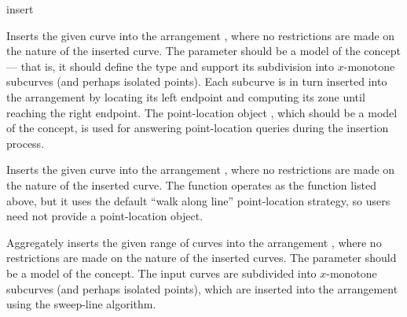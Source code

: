 
\begin{ccRefFunction}{insert}


   {Inserts the given curve  into the arrangement , where
    no restrictions are made on the nature of the inserted curve.
    The  parameter should be a model of the
    concept --- that is, it should define the  type and support
    its subdivision into $x$-monotone subcurves (and perhaps isolated points).
    Each subcurve is in turn inserted into the arrangement by locating its
    left endpoint and computing its zone until reaching the right endpoint.
    The point-location object , which should be a model of the
     concept, is used for answering
    point-location queries during the insertion process.
    }

   {Inserts the given curve  into the arrangement , where
    no restrictions are made on the nature of the inserted curve.
    The function operates as the function listed above, but it uses the default
    ``walk along line'' point-location strategy, so users need not provide a
    point-location object.}

   {Aggregately inserts the given range of curves \ccc{[first,last)} into
    the arrangement , where no restrictions are made on the nature of
    the inserted curves. The  parameter should be a model of the
     concept. The input curves are subdivided into
    $x$-monotone subcurves (and perhaps isolated points), which are inserted
    into the arrangement using the sweep-line algorithm.
    }

\end{ccRefFunction}
